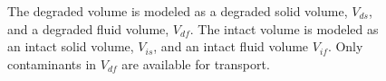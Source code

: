 \begin{figure}[h!]
  \begin{center}
    \def\svgwidth{\columnwidth}
    
  \end{center}
  \caption[Constituents of a Mixed Cell Control Volume]{The degraded volume is 
  modeled as a degraded solid volume, $V_{ds}$, and a degraded fluid volume, 
  $V_{df}$. The intact volume is modeled as an intact solid volume, $V_{is}$, and 
  an intact fluid volume $V_{if}$.  Only contaminants in $V_{df}$ are available 
  for transport.}
  \label{fig:deg_sorb_volumes}
\end{figure}

